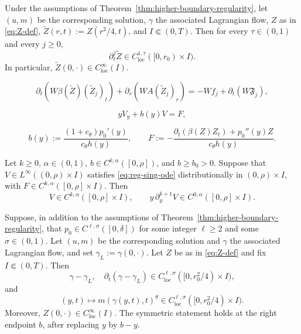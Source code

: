 \documentclass[10pt,a4paper]{amsart}
\newcommand{\loc}{\mathrm{loc}}
\begin{document}
\begin{proposition}
\label{prop:endpoint-schauder-bootstrap}
Under the assumptions of Theorem~\ref{thm:higher-boundary-regularity},
let \((u,m)\) be the corresponding solution, \(\gamma\) the associated
Lagrangian flow, \(Z\) as in \eqref{eq:Z-def},
\(\widetilde Z(r,t):=Z(r^2/4,t)\), and \(I\Subset(0,T)\). Then for every
\(\tau\in(0,1)\) and every \(j\ge0\),
\[
        \partial_t^j\widetilde Z\in C^{1,\tau}_{\loc}([0,r_0)\times I).
\]
In particular, \(\widetilde Z(0,\cdot)\in C^\infty_{\loc}(I)\).
\end{proposition}

\begin{equation}
\label{eq:bootstrap-linear}
        \partial_t\!\left(W\beta(\widetilde Z)(\widetilde Z_j)_t\right)
        +\partial_r\!\left(WA(\widetilde Z_j)_r\right)
        =-Wf_j+\partial_t(W\mathfrak F_j),
\end{equation}

\begin{equation}
\label{eq:reg-sing-ode}
        y V_y+b(y)V=F,
\end{equation}

\begin{equation}
\label{eq:reg-sing-coefs}
        b(y):=\frac{(1+c_\theta)p_0'(y)}{c_\theta h(y)},
        \qquad
        F:=-\frac{\partial_t(\beta(Z)Z_t)+p_0''(y)Z}{c_\theta h(y)} .
\end{equation}

\begin{lemma}
\label{lem:regular-singular-descent}
Let \(k\ge0\), \(\alpha\in(0,1)\), \(b\in C^{k,\alpha}([0,\rho])\), and
\(b\ge b_0>0\). Suppose that \(V\in L^\infty((0,\rho)\times I)\) satisfies
\eqref{eq:reg-sing-ode} distributionally in \((0,\rho)\times I\), with
\(F\in C^{k,\alpha}([0,\rho]\times I)\).
Then
\[
        V\in C^{k,\alpha}([0,\rho]\times I),
        \qquad
        y\,\partial_y^{k+1}V\in C^{0,\alpha}([0,\rho]\times I).
\]
\end{lemma}

\begin{proposition}
\label{prop:finite-endpoint-regularity}
Suppose, in addition to the assumptions of
Theorem~\ref{thm:higher-boundary-regularity}, that
\(p_0\in C^{\ell,\sigma}([0,\delta])\) for some integer \(\ell\ge2\) and
some \(\sigma\in(0,1)\). Let \((u,m)\) be the corresponding solution and
\(\gamma\) the associated Lagrangian flow, and set
\(\gamma_L:=\gamma(0,\cdot)\). Let \(Z\) be as in \eqref{eq:Z-def} and
fix \(I\Subset(0,T)\). Then
\[
        \gamma-\gamma_L,\quad
        \partial_t(\gamma-\gamma_L)\in
        C^{\ell,\sigma}_{\loc}([0,r_0^2/4)\times I),
\]
and
\[
        (y,t)\mapsto m(\gamma(y,t),t)^\theta
        \in C^{\ell,\sigma}_{\loc}([0,r_0^2/4)\times I).
\]
Moreover, \(Z(0,\cdot)\in C^\infty_{\loc}(I)\). The symmetric statement
holds at the right endpoint \(b\), after replacing \(y\) by \(b-y\).
\end{proposition}
\end{document}
